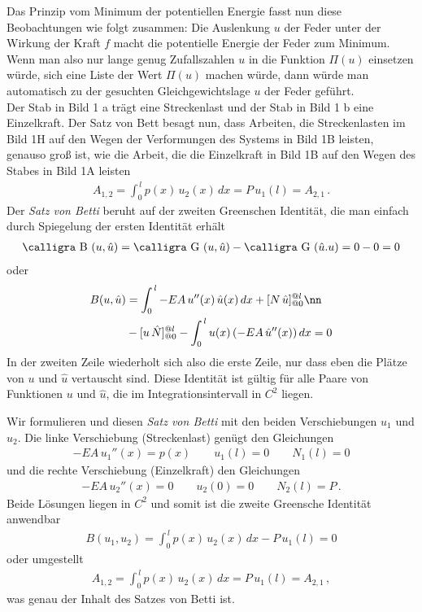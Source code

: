 Das Prinzip vom Minimum der potentiellen Energie fasst nun diese Beobachtungen wie folgt zusammen: Die Auslenkung $ u $ der Feder unter der Wirkung der Kraft $ f $ macht die potentielle Energie der Feder zum Minimum. Wenn man also nur lange genug Zufallszahlen $ u $ in die Funktion $\Pi(u)$ einsetzen w\"{u}rde, sich eine Liste der Wert $\Pi(u)$ machen w\"{u}rde, dann w\"{u}rde man automatisch zu der gesuchten Gleichgewichtslage $u$ der Feder gef\"{u}hrt.\\



Der Stab in Bild 1 a tr\"{a}gt eine Streckenlast und der Stab in Bild 1 b eine Einzelkraft. Der Satz von Bett besagt nun, dass Arbeiten, die Streckenlasten im Bild 1H auf den Wegen der Verformungen des Systems in Bild 1B leisten, genauso gro{\ss} ist, wie die Arbeit, die die Einzelkraft in Bild 1B auf den Wegen des Stabes in Bild 1A leisten
\begin{align}
A_{1,2} = \int_0^{\,l} p(x)\,u_2(x)\,dx = P \,u_1(l) = A_{2,1}\,.
\end{align}
Der {\em Satz von Betti\/} beruht auf der zweiten Greenschen Identit\"{a}t, die man einfach durch Spiegelung der ersten Identit\"{a}t erh\"{a}lt
\begin{align}
\text{\normalfont\calligra B\,\,}(u,\hat{u}) = \text{\normalfont\calligra G\,\,}(u,\hat{u}) - \text{\normalfont\calligra G\,\,}(\hat{u}.u) = 0 - 0 = 0
\end{align}
oder
\begin{align}
B(u,\hat{u}) &= \int_0^{\,l} - EA\,u''(x)\,\hat{u}(x)\,dx + [N\,\hat{u}]_{@0}^{@l} \nn \\
&- [u\,\hat{N}]_{@0}^{@l} - \int_0^{\,l} u(x)\,(- EA\,\hat{u}''(x))\,dx = 0
\end{align}
In der zweiten Zeile wiederholt sich also die erste Zeile, nur dass eben die Pl\"{a}tze von $ u $ und $ \hat{u} $ vertauscht sind. Diese Identit\"{a}t ist g\"{u}ltig f\"{u}r alle Paare von Funktionen $u$ und $\hat{u}$, die im Integrationsintervall in $C^2$ liegen.

Wir formulieren und diesen {\em Satz von Betti\/} mit den beiden Verschiebungen $ u_1 $ und $ u_2 $. Die linke Verschiebung (Streckenlast) gen\"{u}gt den Gleichungen
\begin{align}
- EA\,u_1''(x) = p(x) \qquad u_1(l) = 0 \qquad N_1(l) = 0
\end{align}
und die rechte Verschiebung (Einzelkraft) den Gleichungen
\begin{align}
- EA\,u_2''(x) = 0 \qquad u_2(0) = 0 \qquad N_2(l) = P\,.
\end{align}
Beide L\"{o}sungen liegen in $C^2$ und somit ist die zweite Greensche Identit\"{a}t anwendbar
\begin{align}
B(u_1,u_2) = \int_0^{\,l} p(x)\,u_2(x)\,dx - P\,u_1(l) = 0
\end{align}
oder umgestellt
\begin{align}
A_{1,2} = \int_0^{\,l} p(x)\,u_2(x)\,dx = P\,u_1(l) = A_{2,1}\,,
\end{align}
was genau der Inhalt des Satzes von Betti ist.
\\

